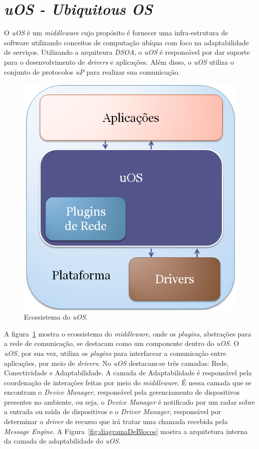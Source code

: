 \section{\emph{uOS - Ubiquitous OS}}

O \emph{uOS} é um \emph{middleware} cujo propósito é fornecer uma infra-estrutura de software utilizando conceitos de computação ubíqua com foco na adaptabilidade de serviços. Utilizando a arquiteura \emph{DSOA}, o \emph{uOS} é responsável por dar suporte para o desenvolvimento de \emph{drivers} e aplicações. Além disso, o \emph{uOS} utiliza o conjunto de protocolos \emph{uP} para realizar sua comunicação.

\begin{figure}[ht]
	\center
	\includegraphics[scale=0.4]{imagens/ecossistemaUbiquitos}
	\caption{Ecossistema do \emph{uOS}.}
	\label{fig:ecossistemaUbiquitos}
\end{figure}

A figura~\ref{fig:ecossistemaUbiquitos} mostra o ecossistema do \emph{middleware}, onde os \emph{plugins}, abstrações para a rede de comunicação, se destacam como um componente dentro do \emph{uOS}. O \emph{uOS}, por sua vez, utiliza os \emph{plugins} para interfacear a comunicação entre aplicações, por meio de \emph{drivers}. No \emph{uOS} destacam-se três camadas: Rede, Conectividade e Adaptabilidade. A camada de Adaptabilidade é responsável pela coordenação de interaçòes feitas por meio do \emph{middleware}. É nessa camada que se encontram o \emph{Device Manager}, responsável pela gerenciamento de dispositivos presentes no ambiente, ou seja, o \emph{Device Manager} é notificado por um radar sobre a entrada ou saída de dispositivos e o \emph{Driver Manager}, responsável por determinar o \emph{driver} de recurso que irá tratar uma chamada recebida pela \emph{Message Engine}. A Figura~\ref{fig:diagramaDeBlocos} mostra a arquitetura interna da camada de adaptabilidade do \emph{uOS}.

